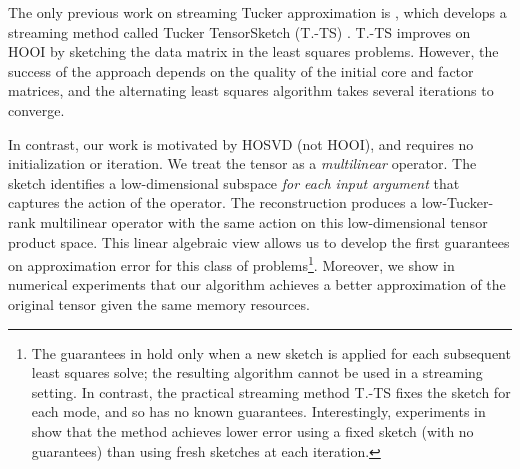 
The only previous work on streaming Tucker approximation is \citep{malik2018low},
which develops a streaming method called Tucker TensorSketch (T.-TS) \cite[Algorithm 2]{malik2018low}.
T.-TS improves on HOOI by sketching the data matrix in the least squares problems.
However, the success of the approach depends on the quality of the initial
core and factor matrices, and the alternating least squares algorithm takes
several iterations to converge.

In contrast, our work is motivated by HOSVD (not HOOI),
and requires no initialization or iteration.
We treat the tensor as a \emph{multilinear} operator.
The sketch identifies a low-dimensional subspace \emph{for each input argument}
that captures the action of the operator.
The reconstruction produces a low-Tucker-rank multilinear operator
with the same action on this low-dimensional tensor product space.
This linear algebraic view allows us to develop the
first guarantees on approximation error for this class of problems\footnote{
The guarantees in \citep{malik2018low} hold only when a new sketch is applied
for each subsequent least squares solve;
the resulting algorithm cannot be used in a streaming setting.
In contrast, the practical streaming method T.-TS fixes the sketch for each mode,
and so has no known guarantees.
Interestingly, experiments in \citep{malik2018low} show that the method achieves
lower error using a fixed sketch (with no guarantees) than using fresh sketches at each iteration.
}.
Moreover, we show in numerical experiments that
our algorithm achieves a better approximation of the original tensor given the same memory resources.

